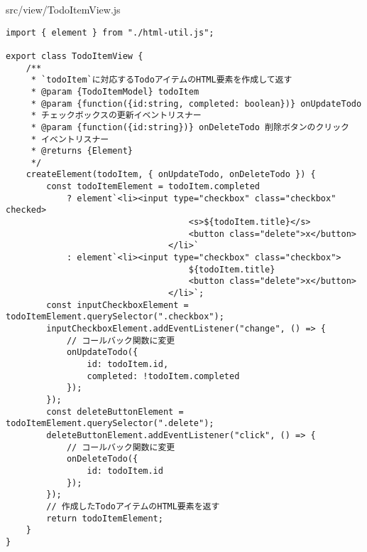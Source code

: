 \begin{listtitle}
src/view/TodoItemView.js
\end{listtitle}
\begin{lstlisting}
import { element } from "./html-util.js";

export class TodoItemView {
    /**
     * `todoItem`に対応するTodoアイテムのHTML要素を作成して返す
     * @param {TodoItemModel} todoItem
     * @param {function({id:string, completed: boolean})} onUpdateTodo
     * チェックボックスの更新イベントリスナー
     * @param {function({id:string})} onDeleteTodo 削除ボタンのクリック
     * イベントリスナー
     * @returns {Element}
     */
    createElement(todoItem, { onUpdateTodo, onDeleteTodo }) {
        const todoItemElement = todoItem.completed
            ? element`<li><input type="checkbox" class="checkbox" checked>
                                    <s>${todoItem.title}</s>
                                    <button class="delete">x</button>
                                </li>`
            : element`<li><input type="checkbox" class="checkbox">
                                    ${todoItem.title}
                                    <button class="delete">x</button>
                                </li>`;
        const inputCheckboxElement = todoItemElement.querySelector(".checkbox");
        inputCheckboxElement.addEventListener("change", () => {
            // コールバック関数に変更
            onUpdateTodo({
                id: todoItem.id,
                completed: !todoItem.completed
            });
        });
        const deleteButtonElement = todoItemElement.querySelector(".delete");
        deleteButtonElement.addEventListener("click", () => {
            // コールバック関数に変更
            onDeleteTodo({
                id: todoItem.id
            });
        });
        // 作成したTodoアイテムのHTML要素を返す
        return todoItemElement;
    }
}
\end{lstlisting}
\listend
